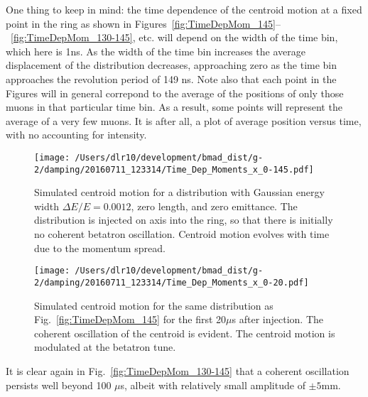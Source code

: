 \documentclass[10pt]{article}
\begin{document}
One thing to keep in mind: the time dependence of the centroid motion at a fixed point
in the ring as shown in Figures~\ref{fig:TimeDepMom_145}--~\ref{fig:TimeDepMom_130-145}, etc. will depend on the width of the time bin, which here is 1ns. 
As the width of the time bin increases the average displacement of the distribution decreases, approaching zero as the time bin approaches the revolution period of 
149 ns. Note also that each point in the Figures will in general correpond to the average of the positions of only those muons
in that particular time bin. As a result, some points will represent the average of a very few muons. It
is after all, a plot of average position versus time, with no accounting for intensity.
%
\begin{figure}[htbp] %
\begin{minipage}[t]{0.48\textwidth}
   \centering
   \texttt{[image: /Users/dlr10/development/bmad\_dist/g-2/damping/20160711\_123314/Time\_Dep\_Moments\_x\_0-145.pdf]} 
   \caption{Simulated centroid motion for a distribution with Gaussian energy width $\Delta E/E=0.0012$, zero length, and zero emittance. The distribution
is injected on axis into the ring, so that there is initially no coherent betatron oscillation. Centroid motion evolves
with time due to the momentum spread.\label{fig:TimeDepMom_145}}
 \end{minipage}
\hfill
\begin{minipage}[t]{0.48\textwidth}
\centering
   \texttt{[image: /Users/dlr10/development/bmad\_dist/g-2/damping/20160711\_123314/Time\_Dep\_Moments\_x\_0-20.pdf]} 
\caption{Simulated centroid motion for the same distribution as Fig.~\ref{fig:TimeDepMom_145} for the first 20$\mu$s after injection. The coherent oscillation of the centroid
is evident. The centroid motion is modulated at the betatron tune.
\label{fig:TimeDepMom_0-20}}
\end{minipage}
\end{figure}
It is clear again in Fig.~\ref{fig:TimeDepMom_130-145} that a coherent oscillation persists well beyond 100 $\mu$s, albeit with relatively small amplitude
of $\pm 5$mm.
\end{document}
